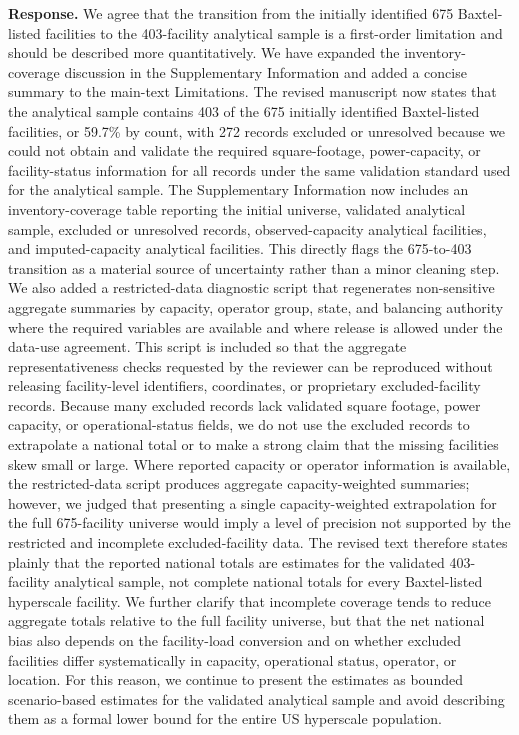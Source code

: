 \documentclass[11pt]{article}
\begin{document}
\textbf{Response.} We agree that the transition from the initially identified 675 Baxtel-listed facilities to the 403-facility analytical sample is a first-order limitation and should be described more quantitatively. We have expanded the inventory-coverage discussion in the Supplementary Information and added a concise summary to the main-text Limitations. The revised manuscript now states that the analytical sample contains 403 of the 675 initially identified Baxtel-listed facilities, or 59.7\% by count, with 272 records excluded or unresolved because we could not obtain and validate the required square-footage, power-capacity, or facility-status information for all records under the same validation standard used for the analytical sample. The Supplementary Information now includes an inventory-coverage table reporting the initial universe, validated analytical sample, excluded or unresolved records, observed-capacity analytical facilities, and imputed-capacity analytical facilities. This directly flags the 675-to-403 transition as a material source of uncertainty rather than a minor cleaning step. We also added a restricted-data diagnostic script that regenerates non-sensitive aggregate summaries by capacity, operator group, state, and balancing authority where the required variables are available and where release is allowed under the data-use agreement. This script is included so that the aggregate representativeness checks requested by the reviewer can be reproduced without releasing facility-level identifiers, coordinates, or proprietary excluded-facility records. Because many excluded records lack validated square footage, power capacity, or operational-status fields, we do not use the excluded records to extrapolate a national total or to make a strong claim that the missing facilities skew small or large. Where reported capacity or operator information is available, the restricted-data script produces aggregate capacity-weighted summaries; however, we judged that presenting a single capacity-weighted extrapolation for the full 675-facility universe would imply a level of precision not supported by the restricted and incomplete excluded-facility data. The revised text therefore states plainly that the reported national totals are estimates for the validated 403-facility analytical sample, not complete national totals for every Baxtel-listed hyperscale facility. We further clarify that incomplete coverage tends to reduce aggregate totals relative to the full facility universe, but that the net national bias also depends on the facility-load conversion and on whether excluded facilities differ systematically in capacity, operational status, operator, or location. For this reason, we continue to present the estimates as bounded scenario-based estimates for the validated analytical sample and avoid describing them as a formal lower bound for the entire US hyperscale population.
\end{document}
